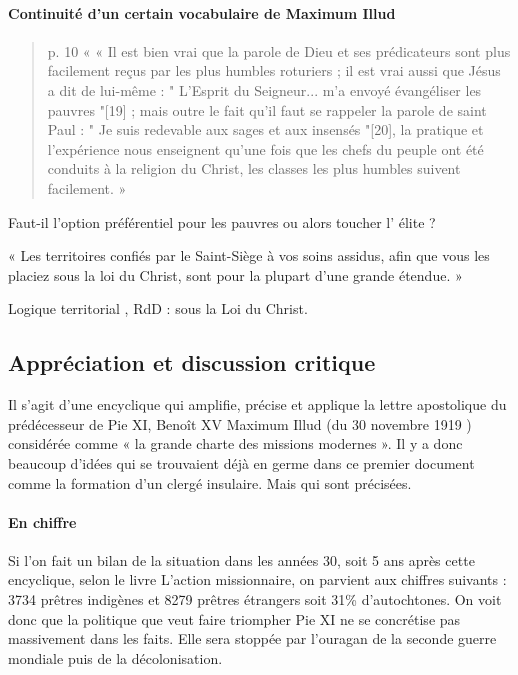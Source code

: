\paragraph{Continuité d'un certain vocabulaire de Maximum Illud}
\begin{quote}
    p. 10 
« « Il est bien vrai que la parole de Dieu et ses prédicateurs sont plus facilement reçus par les plus humbles roturiers ; il est vrai aussi que Jésus a dit de lui-même : " L'Esprit du Seigneur... m'a envoyé évangéliser les pauvres "[19] ; mais outre le fait qu'il faut se rappeler la parole de saint Paul : " Je suis redevable aux sages et aux insensés "[20], la pratique et l'expérience nous enseignent qu'une fois que les chefs du peuple ont été conduits à la religion du Christ, les classes les plus humbles suivent facilement. »
\end{quote}


Faut-il l’option préférentiel pour les pauvres ou alors toucher l’ élite ?
\begin{quote}
    
\end{quote}
« Les territoires confiés par le Saint-Siège à vos soins assidus, afin que vous les placiez sous la loi du Christ, sont pour la plupart d'une grande étendue. »

Logique territorial , RdD : sous la Loi du Christ.


\subsection{ Appréciation et discussion critique}
 

Il s’agit d’une encyclique qui amplifie, précise et applique la lettre apostolique du prédécesseur de Pie XI, Benoît XV Maximum Illud (du 30 novembre 1919 ) considérée comme « la grande charte des missions modernes ». Il y a donc beaucoup d’idées qui se trouvaient déjà en germe dans ce premier document comme la formation d’un clergé insulaire. Mais qui sont précisées. 


\paragraph{En chiffre}
Si l’on fait un bilan de la situation dans les années 30, soit 5 ans après cette encyclique, selon le livre L’action missionnaire, on parvient aux chiffres suivants : 3734 prêtres indigènes et 8279 prêtres étrangers soit 31\% d’autochtones. On voit donc que la politique que veut faire triompher Pie XI ne se concrétise pas massivement dans les faits. Elle sera stoppée par l’ouragan de la seconde guerre mondiale puis de la décolonisation.

